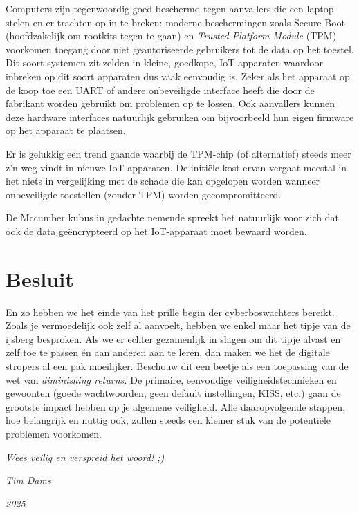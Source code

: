 \documentclass[
  10pt,
  dutch,
  paper=a4,
  ,captions=tableheading
]{scrbook}
\begin{document}
Computers zijn tegenwoordig goed beschermd tegen aanvallers die een
laptop stelen en er trachten op in te breken: moderne beschermingen
zoals Secure Boot (hoofdzakelijk om rootkits tegen te gaan) en
\emph{Trusted Platform Module} (TPM) voorkomen toegang door niet
geautoriseerde gebruikers tot de data op het toestel. Dit soort systemen
zit zelden in kleine, goedkope, IoT-apparaten waardoor inbreken op dit
soort apparaten dus vaak eenvoudig is. Zeker als het apparaat op de koop
toe een UART of andere onbeveiligde interface heeft die door de
fabrikant worden gebruikt om problemen op te lossen. Ook aanvallers
kunnen deze hardware interfaces natuurlijk gebruiken om bijvoorbeeld hun
eigen firmware op het apparaat te plaatsen.

\begin{tipblock}
Er is gelukkig een trend gaande waarbij de TPM-chip (of alternatief)
steeds meer z'n weg vindt in nieuwe IoT-apparaten. De initiële kost
ervan vergaat meestal in het niets in vergelijking met de schade die kan
opgelopen worden wanneer onbeveiligde toestellen (zonder TPM) worden
gecompromitteerd.
\end{tipblock}

De Mccumber kubus in gedachte nemende spreekt het natuurlijk voor zich
dat ook de data geëncrypteerd op het IoT-apparaat moet bewaard worden.

\chapter{Besluit}\label{besluit}

En zo hebben we het einde van het prille begin der cyberboswachters
bereikt. Zoals je vermoedelijk ook zelf al aanvoelt, hebben we enkel
maar het tipje van de ijsberg besproken. Als we er echter gezamenlijk in
slagen om dit tipje alvast en zelf toe te passen én aan anderen aan te
leren, dan maken we het de digitale stropers al een pak moeilijker.
Beschouw dit een beetje als een toepassing van de wet van
\emph{diminishing returns.} De primaire, eenvoudige
veiligheidstechnieken en gewoonten (goede wachtwoorden, geen default
instellingen, KISS, etc.) gaan de grootste impact hebben op je algemene
veiligheid. Alle daaropvolgende stappen, hoe belangrijk en nuttig ook,
zullen steeds een kleiner stuk van de potentiële problemen voorkomen.

\emph{Wees veilig en verspreid het woord! ;)}

\emph{Tim Dams}

\emph{2025}
\end{document}

